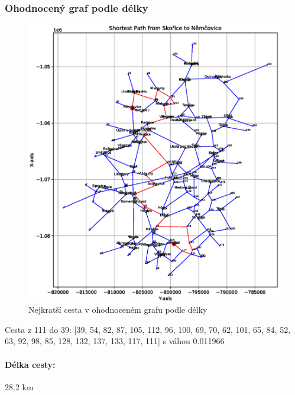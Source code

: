 \subsubsection*{Ohodnocený graf podle délky}
\begin{figure}[H]
    \centering
    \includegraphics[width=\textwidth]{images/Figure_1_length.eps}
    \caption{Nejkratší cesta v ohodnoceném grafu podle délky}
\end{figure}
Cesta z 111 do 39: [39, 54, 82, 87, 105, 112, 96, 100, 69, 70, 62, 101, 65, 84, 52, 63, 92, 98, 85, 128, 132, 137, 133, 117, 111] s váhou 0.011966
\paragraph{Délka cesty:} 28.2 km
